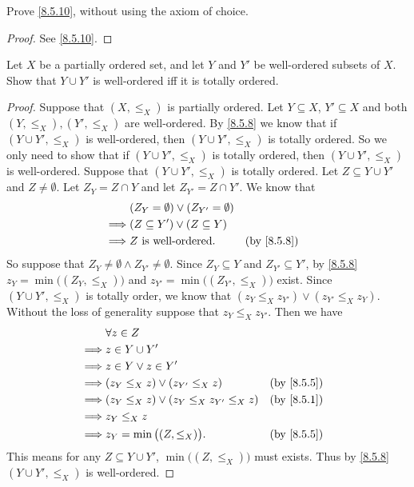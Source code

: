 \begin{ex}\label{ex:8.5.10}
  Prove \cref{8.5.10}, without using the axiom of choice.
\end{ex}

\begin{proof}
  See \cref{8.5.10}.
\end{proof}

\begin{ex}\label{ex:8.5.11}
  Let \(X\) be a partially ordered set, and let \(Y\) and \(Y'\) be well-ordered subsets of \(X\).
  Show that \(Y \cup Y'\) is well-ordered iff it is totally ordered.
\end{ex}

\begin{proof}
  Suppose that \((X, \leq_X)\) is partially ordered.
  Let \(Y \subseteq X\), \(Y' \subseteq X\) and both \((Y, \leq_X), (Y', \leq_X)\) are well-ordered.
  By \cref{8.5.8} we know that if \((Y \cup Y', \leq_X)\) is well-ordered, then \((Y \cup Y', \leq_X)\) is totally ordered.
  So we only need to show that if \((Y \cup Y', \leq_X)\) is totally ordered, then \((Y \cup Y', \leq_X)\) is well-ordered.
  Suppose that \((Y \cup Y', \leq_X)\) is totally ordered.
  Let \(Z \subseteq Y \cup Y'\) and \(Z \neq \emptyset\).
  Let \(Z_Y = Z \cap Y\) and let \(Z_{Y'} = Z \cap Y'\).
  We know that
  \begin{align*}
             & (Z_Y = \emptyset) \lor (Z_{Y'} = \emptyset)                 \\
    \implies & (Z \subseteq Y') \lor (Z \subseteq Y)                       \\
    \implies & Z \text{ is well-ordered}.                  &  & \by{8.5.8}
  \end{align*}
  So suppose that \(Z_Y \neq \emptyset \land Z_{Y'} \neq \emptyset\).
  Since \(Z_Y \subseteq Y\) and \(Z_{Y'} \subseteq Y'\), by \cref{8.5.8} \(z_Y = \min\big((Z_Y, \leq_X)\big)\) and \(z_{Y'} = \min\big((Z_{Y'}, \leq_X)\big)\) exist.
  Since \((Y \cup Y', \leq_X)\) is totally order, we know that \((z_Y \leq_X z_{Y'}) \lor (z_{Y'} \leq_X z_Y)\).
  Without the loss of generality suppose that \(z_Y \leq_X z_{Y'}\).
  Then we have
  \begin{align*}
             & \forall z \in Z                                                  \\
    \implies & z \in Y \cup Y'                                                  \\
    \implies & z \in Y \lor z \in Y'                                            \\
    \implies & (z_Y \leq_X z) \lor (z_{Y'} \leq_X z)            &  & \by{8.5.5} \\
    \implies & (z_Y \leq_X z) \lor (z_Y \leq_X z_{Y'} \leq_X z) &  & \by{8.5.1} \\
    \implies & z_Y \leq_X z                                                     \\
    \implies & z_Y = \min\big((Z, \leq_X)\big).                 &  & \by{8.5.5}
  \end{align*}
  This means for any \(Z \subseteq Y \cup Y'\), \(\min\big((Z, \leq_X)\big)\) must exists.
  Thus by \cref{8.5.8} \((Y \cup Y', \leq_X)\) is well-ordered.
\end{proof}

